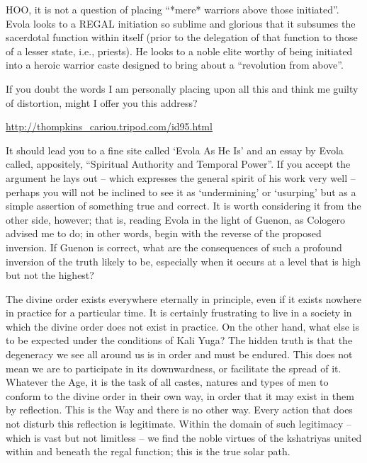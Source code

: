 \begin{footnotesize}
\begin{sffamily}
HOO, it is not a question of placing ``*mere* warriors above those initiated''. Evola looks to a REGAL initiation so sublime and glorious that it subsumes the sacerdotal function within itself (prior to the delegation of that function to those of a lesser state, i.e., priests). He looks to a noble elite worthy of being initiated into a heroic warrior caste designed to bring about a ``revolution from above''.

If you doubt the words I am personally placing upon all this and think me guilty of distortion, might I offer you this address?

\url{http://thompkins_cariou.tripod.com/id95.html}


It should lead you to a fine site called `Evola As He Is' and an essay by Evola called, appositely, ``Spiritual Authority and Temporal Power''. If you accept the argument he lays out -- which expresses the general spirit of his work very well -- perhaps you will not be inclined to see it as `undermining' or `usurping' but as a simple assertion of something true and correct. It is worth considering it from the other side, however; that is, reading Evola in the light of Guenon, as Cologero advised me to do; in other words, begin with the reverse of the proposed inversion. If Guenon is correct, what are the consequences of such a profound inversion of the truth likely to be, especially when it occurs at a level that is high but not the highest?

The divine order exists everywhere eternally in principle, even if it exists nowhere in practice for a particular time. It is certainly frustrating to live in a society in which the divine order does not exist in practice. On the other hand, what else is to be expected under the conditions of Kali Yuga? The hidden truth is that the degeneracy we see all around us is in order and must be endured. This does not mean we are to participate in its downwardness, or facilitate the spread of it. Whatever the Age, it is the task of all castes, natures and types of men to conform to the divine order in their own way, in order that it may exist in them by reflection. This is the Way and there is no other way. Every action that does not disturb this reflection is legitimate. Within the domain of such legitimacy -- which is vast but not limitless -- we find the noble virtues of the kshatriyas united within and beneath the regal function; this is the true solar path.


\end{sffamily}
\end{footnotesize}
